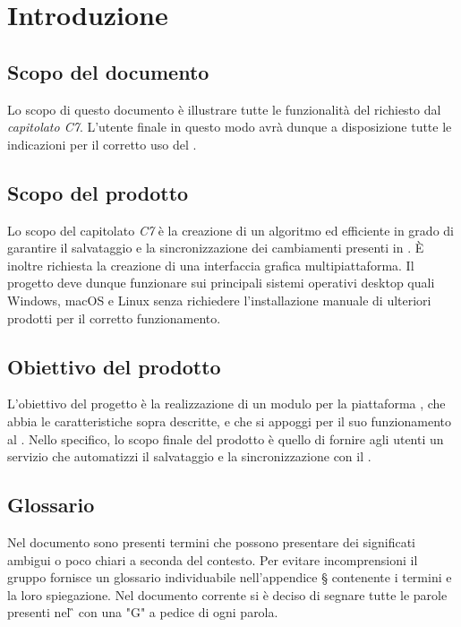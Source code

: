 \section{Introduzione}
\subsection{Scopo del documento}
Lo scopo di questo documento è illustrare tutte le funzionalità del  richiesto dal \textit{capitolato C7}. L'utente finale in questo modo avrà dunque a disposizione tutte le indicazioni per il corretto uso del .

\subsection{Scopo del prodotto}
Lo scopo del capitolato \textit{C7} è la creazione di un algoritmo  ed efficiente in grado di garantire il salvataggio e la sincronizzazione dei cambiamenti presenti in . È inoltre richiesta la creazione di una interfaccia grafica multipiattaforma. Il progetto deve dunque funzionare sui principali sistemi operativi desktop quali Windows, macOS e Linux senza richiedere l'installazione manuale di ulteriori prodotti per il corretto funzionamento. 
\subsection{Obiettivo del prodotto}
L'obiettivo del progetto è la realizzazione di un modulo per la piattaforma , che abbia le caratteristiche sopra descritte, e che si appoggi per il suo funzionamento al  .
Nello specifico, lo scopo finale del prodotto è quello di fornire agli utenti un servizio che automatizzi il salvataggio e la sincronizzazione con il .
\subsection{Glossario}
Nel documento sono presenti termini che possono presentare dei significati ambigui o poco chiari a seconda del contesto.
Per evitare incomprensioni il gruppo fornisce un glossario individuabile nell'appendice \S{} contenente i termini e la loro spiegazione.\newline{}
Nel documento corrente si è deciso di segnare tutte le parole presenti nel \G{} con una "G" a pedice di ogni parola.